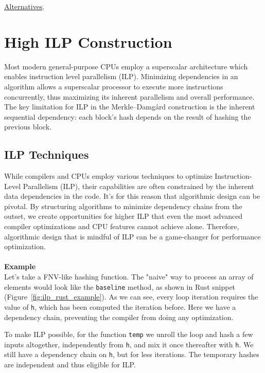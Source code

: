 \documentclass[11pt]{article}
\begin{document}
\href{https://www.researchgate.net/publication/322094216_Merkle-Damgard_Construction_Method_and_Alternatives_A_Review}{Alternatives}.

\section{High ILP Construction} \label{highilp}

Most modern general-purpose CPUs employ a superscalar architecture which enables instruction level parallelism (ILP). 
Minimizing dependencies in an algorithm allows a superscalar processor to execute more instructions concurrently, thus maximizing its inherent parallelism and overall performance.
The key limitation for ILP in the Merkle–Damgård construction is the inherent sequential dependency: each block's hash depends on the result of hashing the previous block.

\subsection{ILP Techniques}

While compilers and CPUs employ various techniques to optimize Instruction-Level Parallelism (ILP), their capabilities are often constrained by the inherent data dependencies in the code. It's for this reason that algorithmic design can be pivotal. By structuring algorithms to minimize dependency chains from the outset, we create opportunities for higher ILP that even the most advanced compiler optimizations and CPU features cannot achieve alone. Therefore, algorithmic design that is mindful of ILP can be a game-changer for performance optimization.
\\\\
\textbf{Example}\\
Let's take a FNV-like hashing function. The "naive" way to process an array of elements would look like the \texttt{baseline} method, as shown in Rust snippet (Figure~\ref{fig:ilp_rust_example}). As we can see, every loop iteration requires the value of \texttt{h}, which has been computed the iteration before. Here we have a dependency chain, preventing the compiler from doing any optimization.

To make ILP possible, for the function \texttt{temp} we unroll the loop and hash a few inputs altogether, independently from \texttt{h}, and mix it once thereafter with \texttt{h}. We still have a dependency chain on \texttt{h}, but for less iterations. The temporary hashes are independent and thus eligible for ILP.
\end{document}
